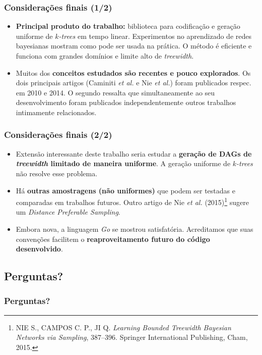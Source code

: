 \documentclass{beamer}
\begin{document}
  \begin{frame}
    \frametitle{Considerações finais (1/2)}

    \begin{itemize}
      \item \textbf{Principal produto do trabalho:} biblioteca para codificação e geração uniforme de \emph{$k$-trees} em tempo linear. Experimentos no aprendizado de redes bayesianas mostram como pode ser usada na prática. O método é eficiente e funciona com grandes domínios e limite alto de \emph{treewidth}.
      \item Muitos dos \textbf{conceitos estudados são recentes e pouco explorados}. Os dois principais artigos (Caminiti \emph{et al.} e Nie \emph{et al.}) foram publicados respec. em 2010 e 2014. O segundo ressalta que simultaneamente ao seu desenvolvimento foram publicados independentemente outros trabalhos intimamente relacionados.
    \end{itemize}
  \end{frame}

  \begin{frame}
    \frametitle{Considerações finais (2/2)}

    \begin{itemize}
      \item Extensão interessante deste trabalho seria estudar a \textbf{geração de DAGs de \emph{treewidth} limitado de maneira uniforme}. A geração uniforme de \emph{$k$-trees} não resolve esse problema.
      \item Há \textbf{outras amostragens (não uniformes)} que podem ser testadas e comparadas em trabalhos futuros. Outro artigo de Nie \emph{et al.} (2015)\footnote{\scriptsize NIE S., CAMPOS C. P., JI Q. \emph{Learning Bounded Treewidth Bayesian Networks via Sampling}, 387--396. Springer International Publishing, Cham, 2015.} sugere um \emph{Distance Preferable Sampling}.
      \item Embora nova, a linguagem \emph{Go} se mostrou satisfatória. Acreditamos que suas convenções facilitem o \textbf{reaproveitamento futuro do código desenvolvido}.
    \end{itemize}
  \end{frame}

%
%

  \subsection{Perguntas?}

  \begin{frame}
    \frametitle{Perguntas?}

  \end{frame}
\end{document}
